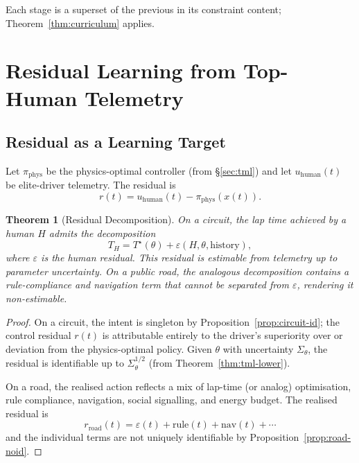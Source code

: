 \documentclass[11pt,twocolumn]{article}
\newtheorem{theorem}{Theorem}
\theoremstyle{definition}
\theoremstyle{remark}
\begin{document}
Each stage is a superset of the previous in its constraint content; Theorem~\ref{thm:curriculum} applies.

\section{Residual Learning from Top-Human Telemetry}
\label{sec:residual}

\subsection{Residual as a Learning Target}

Let $\pi_{\mathrm{phys}}$ be the physics-optimal controller (from \S\ref{sec:tml}) and let $u_{\mathrm{human}}(t)$ be elite-driver telemetry. The residual is
\begin{equation}
r(t) = u_{\mathrm{human}}(t) - \pi_{\mathrm{phys}}(x(t)).
\end{equation}

\begin{theorem}[Residual Decomposition]\label{thm:residual}
On a circuit, the lap time achieved by a human $H$ admits the decomposition
\begin{equation}
T_H = T^{\star}(\theta) + \varepsilon(H, \theta, \text{history}),
\end{equation}
where $\varepsilon$ is the human residual. This residual is estimable from telemetry up to parameter uncertainty. On a public road, the analogous decomposition contains a rule-compliance and navigation term that cannot be separated from $\varepsilon$, rendering it non-estimable.
\end{theorem}

\begin{proof}
On a circuit, the intent is singleton by Proposition~\ref{prop:circuit-id}; the control residual $r(t)$ is attributable entirely to the driver's superiority over or deviation from the physics-optimal policy. Given $\theta$ with uncertainty $\Sigma_\theta$, the residual is identifiable up to $\Sigma_\theta^{1/2}$ (from Theorem~\ref{thm:tml-lower}).

On a road, the realised action reflects a mix of lap-time (or analog) optimisation, rule compliance, navigation, social signalling, and energy budget. The realised residual is
\begin{equation}
r_{\mathrm{road}}(t) = \varepsilon(t) + \text{rule}(t) + \text{nav}(t) + \cdots
\end{equation}
and the individual terms are not uniquely identifiable by Proposition~\ref{prop:road-noid}.
\end{proof}
\end{document}
